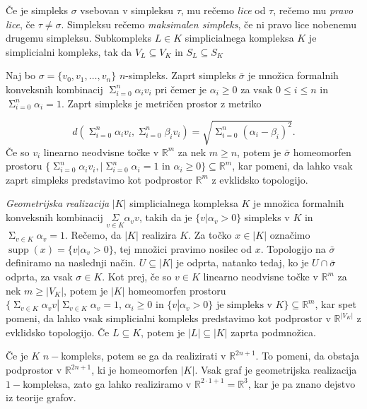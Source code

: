 \documentclass[mat1]{fmfdelo}
\DeclareRobustCommand{\si}{
    \bar{\sigma}
}
\DeclareMathOperator*{\supp}{supp}
\newcommand\mymathop[1]{\mathop{\operatorname{#1}}}
\begin{document}
Če je simpleks $\sigma$ vsebovan  v simpleksu $\tau$, mu rečemo \textit{lice} od $\tau$, rečemo mu \textit{pravo lice}, če $\tau\neq \sigma$. 
Simpleksu rečemo \textit{maksimalen simpleks}, če ni pravo lice nobenemu drugemu simpleksu. Subkompleks $L\in K$ simplicialnega kompleksa
 $K$ je simplicialni kompleks, tak da $V_L\subseteq V_K$ in $S_L\subseteq S_K$


Naj bo $\sigma = \{v_0,v_1,\ldots,v_n\}$ $n$-simpleks. Zaprt
simpleks $\bar{\sigma}$ je množica formalnih konveksnih kombinacij $\mymathop{\Sigma}_{i=0}^{n}\alpha_i v_i$
pri čemer je $\alpha_i \ge 0$ za vsak $0\le i \le n$ in $\mymathop{\Sigma}_{i=0}^{n}\alpha_i = 1$. Zaprt simpleks je metričen prostor z metriko

\begin{equation}
    \label{eq:metrika}    
d(\mymathop{\Sigma}_{i=0}^{n}\alpha_i v_i,\mymathop{\Sigma}_{i=0}^{n}\beta_i v_i) = \sqrt{\mymathop{\Sigma}_{i=0}^{n}(\alpha_i - \beta_i)^2}.
\end{equation}
Če so $v_i$ linearno neodvisne točke v $\mathbb{R}^m$ za nek $m\geq n$, potem je $\bar{\sigma}$ homeomorfen prostoru 
$\{\mymathop{\Sigma}_{i=0}^{n}\alpha_i v_i, | \mymathop{\Sigma}_{i=0}^{n}\alpha_i = 1 \text{ in } \alpha_i \ge 0 \}\subseteq \mathbb{R}^m$, 
kar pomeni, da lahko vsak zaprt simpleks predstavimo kot podprostor $\mathbb{R}^m$ z evklidsko topologijo.

\textit{Geometrijska realizacija} $|K|$ simplicialnega kompleksa $K$ je 
množica formalnih konveksnih kombinacij $\underset{v \in K}{\Sigma}\alpha_v v$, takih da je $\{v | \alpha_v > 0\}$ simpleks v $K$ in 
$\mymathop{\Sigma}_{v\in K}\alpha_v=1$. Rečemo, da $|K|$ realizira $K$. Za točko $x\in |K|$ označimo $\supp(x)=\{v | \alpha_v > 0\}$, 
tej množici pravimo nosilec od $x$. Topologijo na $\si$ definiramo na naslednji način. $U \subseteq |K|$ je odprta, natanko tedaj, ko je $U \cap 
\si$ odprta, za vsak $\sigma \in K$. Kot prej, če so $v\in K$ linearno neodvisne točke v $\mathbb{R}^m$ za nek $m\geq |V_K|$, potem je 
$|K|$ homeomorfen prostoru $\{\mymathop{\Sigma}_{v\in K}\alpha_v v | \mymathop{\Sigma}_{v\in K} \alpha_v = 1 \text{, } \alpha_i
\ge 0 \text{ in } \{v | \alpha_v > 0\} \text{ je simpleks v $K$}\} \subseteq \mathbb{R}^m$, kar spet pomeni, da lahko vsak simplicialni
kompleks predstavimo kot podprostor v $\mathbb{R}^{|V_K|}$ z evklidsko topologijo.
Če $L\subseteq K$, potem je $|L|\subseteq |K|$ zaprta podmnožica.

\begin{opomba}
    Če je $K$ $n-$kompleks, potem se ga da realizirati v $\mathbb{R}^{2n+1}$. To pomeni, da obstaja podprostor v
    $\mathbb{R}^{2n+1}$, ki je homeomorfen $|K|$. Vsak graf je geometrijska realizacija $1-$kompleksa, zato ga 
    lahko realiziramo v $\mathbb{R}^{2\cdot 1 +1}=\mathbb{R}^{3}$, kar je pa znano dejstvo iz teorije grafov.
\end{opomba}
\end{document}
